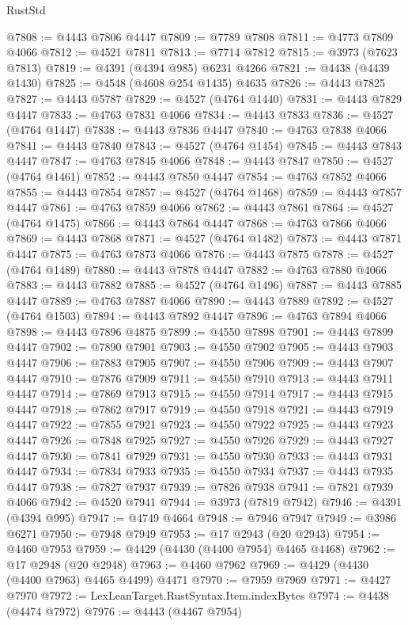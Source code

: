 \begin{lexlean}{RustStd}
\begin{coremodule}
@7808 := @4443 @7806 @4447
@7809 := @7789 @7808
@7811 := @4773 @7809 @4066
@7812 := @4521 @7811
@7813 := @7714 @7812
@7815 := @3973 (@7623 @7813)
@7819 := @4391 (@4394 @985) @6231 @4266
@7821 := @4438 (@4439 @1430)
@7825 := @4548 (@4608 @254 @1435) @4635
@7826 := @4443 @7825
@7827 := @4443 @5787
@7829 := @4527 (@4764 @1440)
@7831 := @4443 @7829 @4447
@7833 := @4763 @7831 @4066
@7834 := @4443 @7833
@7836 := @4527 (@4764 @1447)
@7838 := @4443 @7836 @4447
@7840 := @4763 @7838 @4066
@7841 := @4443 @7840
@7843 := @4527 (@4764 @1454)
@7845 := @4443 @7843 @4447
@7847 := @4763 @7845 @4066
@7848 := @4443 @7847
@7850 := @4527 (@4764 @1461)
@7852 := @4443 @7850 @4447
@7854 := @4763 @7852 @4066
@7855 := @4443 @7854
@7857 := @4527 (@4764 @1468)
@7859 := @4443 @7857 @4447
@7861 := @4763 @7859 @4066
@7862 := @4443 @7861
@7864 := @4527 (@4764 @1475)
@7866 := @4443 @7864 @4447
@7868 := @4763 @7866 @4066
@7869 := @4443 @7868
@7871 := @4527 (@4764 @1482)
@7873 := @4443 @7871 @4447
@7875 := @4763 @7873 @4066
@7876 := @4443 @7875
@7878 := @4527 (@4764 @1489)
@7880 := @4443 @7878 @4447
@7882 := @4763 @7880 @4066
@7883 := @4443 @7882
@7885 := @4527 (@4764 @1496)
@7887 := @4443 @7885 @4447
@7889 := @4763 @7887 @4066
@7890 := @4443 @7889
@7892 := @4527 (@4764 @1503)
@7894 := @4443 @7892 @4447
@7896 := @4763 @7894 @4066
@7898 := @4443 @7896 @4875
@7899 := @4550 @7898
@7901 := @4443 @7899 @4447
@7902 := @7890 @7901
@7903 := @4550 @7902
@7905 := @4443 @7903 @4447
@7906 := @7883 @7905
@7907 := @4550 @7906
@7909 := @4443 @7907 @4447
@7910 := @7876 @7909
@7911 := @4550 @7910
@7913 := @4443 @7911 @4447
@7914 := @7869 @7913
@7915 := @4550 @7914
@7917 := @4443 @7915 @4447
@7918 := @7862 @7917
@7919 := @4550 @7918
@7921 := @4443 @7919 @4447
@7922 := @7855 @7921
@7923 := @4550 @7922
@7925 := @4443 @7923 @4447
@7926 := @7848 @7925
@7927 := @4550 @7926
@7929 := @4443 @7927 @4447
@7930 := @7841 @7929
@7931 := @4550 @7930
@7933 := @4443 @7931 @4447
@7934 := @7834 @7933
@7935 := @4550 @7934
@7937 := @4443 @7935 @4447
@7938 := @7827 @7937
@7939 := @7826 @7938
@7941 := @7821 @7939 @4066
@7942 := @4520 @7941
@7944 := @3973 (@7819 @7942)
@7946 := @4391 (@4394 @995)
@7947 := @4749 @4664
@7948 := @7946 @7947
@7949 := @3986 @6271
@7950 := @7948 @7949
@7953 := @17 @2943 (@20 @2943)
@7954 := @4460 @7953
@7959 := @4429 (@4430 (@4400 @7954) @4465 @4468)
@7962 := @17 @2948 (@20 @2948)
@7963 := @4460 @7962
@7969 := @4429 (@4430 (@4400 @7963) @4465 @4499) @4471
@7970 := @7959 @7969
@7971 := @4427 @7970
@7972 := LexLeanTarget.RustSyntax.Item.indexBytes
@7974 := @4438 (@4474 @7972)
@7976 := @4443 (@4467 @7954)

\end{coremodule}
\end{lexlean}

